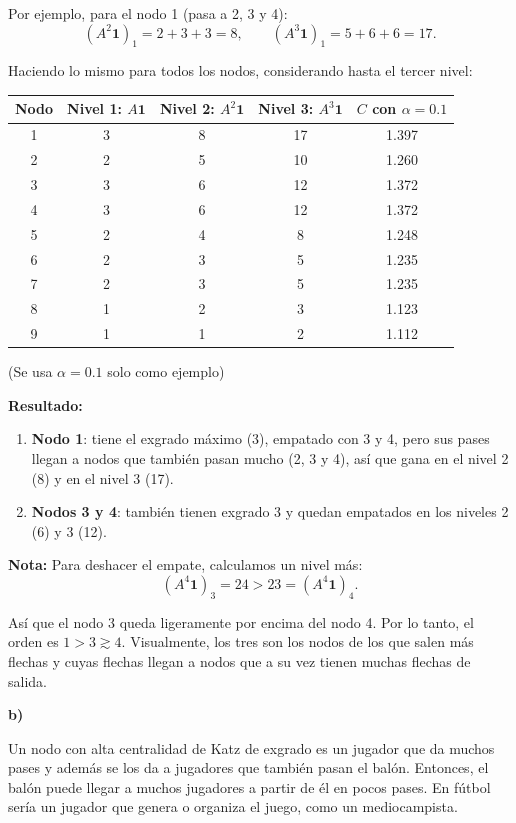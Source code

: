 \documentclass[11pt]{article}
\begin{document}
Por ejemplo, para el nodo 1 (pasa a 2, 3 y 4):
\[
(A^2\mathbf{1})_1 = 2 + 3 + 3 = 8, \qquad (A^3\mathbf{1})_1 = 5 + 6 + 6 = 17 .
\]

Haciendo lo mismo para todos los nodos, considerando hasta el tercer nivel:

\begin{center}
\begin{tabular}{ccccc}
\toprule
Nodo & Nivel 1: $A\mathbf{1}$ & Nivel 2: $A^2\mathbf{1}$ & Nivel 3: $A^3\mathbf{1}$ & $C$ con $\alpha=0.1$ \\
\midrule
1 & 3 & 8 & 17 & 1.397 \\
2 & 2 & 5 & 10 & 1.260 \\
3 & 3 & 6 & 12 & 1.372 \\
4 & 3 & 6 & 12 & 1.372 \\
5 & 2 & 4 & 8  & 1.248 \\
6 & 2 & 3 & 5  & 1.235 \\
7 & 2 & 3 & 5  & 1.235 \\
8 & 1 & 2 & 3  & 1.123 \\
9 & 1 & 1 & 2  & 1.112 \\
\bottomrule
\end{tabular}
\end{center}

(Se usa $\alpha = 0.1$ solo como ejemplo)

\textbf{Resultado:}
\begin{enumerate}
  \item \textbf{Nodo 1}: tiene el exgrado máximo (3), empatado con 3 y 4, pero sus pases llegan a
        nodos que también pasan mucho (2, 3 y 4), así que gana en el nivel 2 (8) y en el nivel 3 (17).
  \item[2--3.] \textbf{Nodos 3 y 4}: también tienen exgrado 3 y quedan empatados
        en los niveles 2 (6) y 3 (12). 
\end{enumerate}
\textbf{Nota:} Para deshacer el empate, calculamos un nivel más:
\[
(A^4\mathbf{1})_3 = 24 > 23 = (A^4\mathbf{1})_4.
\]

Así que el nodo 3 queda ligeramente por encima del nodo 4.
Por lo tanto, el orden es $1 > 3 \gtrsim 4$. Visualmente, los tres son los nodos de los que salen
más flechas y cuyas flechas llegan a nodos que a su vez tienen muchas flechas de salida.

\textbf{b)}

Un nodo con alta centralidad de Katz de exgrado es un jugador que da muchos pases y además se los da a 
jugadores que también pasan el balón. Entonces, el balón puede llegar a muchos jugadores a partir de él 
en pocos pases. En fútbol sería un jugador que genera o organiza el juego, como un mediocampista.
\end{document}
